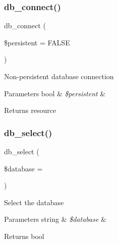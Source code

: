 \subsubsection{\texorpdfstring{db\+\_\+connect()}{db\_connect()}}
{\footnotesize\ttfamily db\+\_\+connect (\begin{DoxyParamCaption}\item[{}]{\$persistent = {\ttfamily FALSE} }\end{DoxyParamCaption})}

Non-\/persistent database connection


\begin{DoxyParams}[1]{Parameters}
bool & {\em \$persistent} & \\
\hline
\end{DoxyParams}
\begin{DoxyReturn}{Returns}
resource 
\end{DoxyReturn}
\mbox{\label{class_c_i___d_b__mysql__driver_a18ae9c21870b30b45337c5e3626190cc}} 
\subsubsection{\texorpdfstring{db\+\_\+select()}{db\_select()}}
{\footnotesize\ttfamily db\+\_\+select (\begin{DoxyParamCaption}\item[{}]{\$database = {\ttfamily \textquotesingle{}\textquotesingle{}} }\end{DoxyParamCaption})}

Select the database


\begin{DoxyParams}[1]{Parameters}
string & {\em \$database} & \\
\hline
\end{DoxyParams}
\begin{DoxyReturn}{Returns}
bool 
\end{DoxyReturn}
\mbox{\label{class_c_i___d_b__mysql__driver_a43b8d30b879d4f09ceb059b02af2bc02}} 
